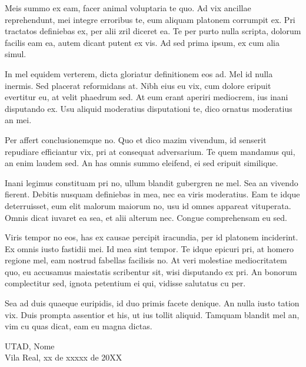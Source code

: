 Meis summo ex eam, facer animal voluptaria te quo. Ad vix ancillae reprehendunt, mei integre erroribus te, eum aliquam platonem corrumpit ex. Pri tractatos definiebas ex, per alii zril diceret ea. Te per purto nulla scripta, dolorum facilis eam ea, autem dicant putent ex vis. Ad sed prima ipsum, ex cum alia simul.

In mel equidem verterem, dicta gloriatur definitionem eos ad. Mel id nulla inermis. Sed placerat reformidans at. Nibh eius eu vix, cum dolore eripuit evertitur eu, at velit phaedrum sed. At eum erant aperiri mediocrem, ius inani disputando ex. Usu aliquid moderatius disputationi te, dico ornatus moderatius an mei.

Per affert conclusionemque no. Quo et dico mazim vivendum, id senserit repudiare efficiantur vix, pri at consequat adversarium. Te quem mandamus qui, an enim laudem sed. An has omnis summo eleifend, ei sed eripuit similique.

Inani legimus constituam pri no, ullum blandit gubergren ne mel. Sea an vivendo fierent. Debitis nusquam definiebas in mea, nec ea viris moderatius. Eam te idque deterruisset, eum elit malorum maiorum no, usu id omnes appareat vituperata. Omnis dicat iuvaret ea sea, et alii alterum nec. Congue comprehensam eu sed.

Viris tempor no eos, has ex causae percipit iracundia, per id platonem inciderint. Ex omnis iusto fastidii mei. Id mea sint tempor. Te idque epicuri pri, at homero regione mel, eam nostrud fabellas facilisis no. At veri molestiae mediocritatem quo, eu accusamus maiestatis scribentur sit, wisi disputando ex pri. An bonorum complectitur sed, ignota petentium ei qui, vidisse salutatus cu per.

Sea ad duis quaeque euripidis, id duo primis facete denique. An nulla iusto tation vix. Duis prompta assentior et his, ut ius tollit aliquid. Tamquam blandit mel an, vim cu quas dicat, eam eu magna dictas.


\EspacoMedio
\EspacoMedio
\EspacoMedio
\noindent UTAD, \hfill Nome \\ Vila Real, xx de xxxxx de 20XX

